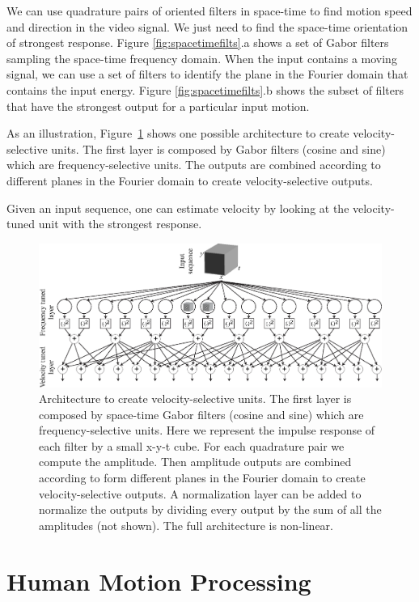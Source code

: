 We can use quadrature pairs of oriented filters in space-time to find motion
speed and direction in the video signal.  We just need to find the
space-time orientation of strongest response. Figure \ref{fig:spacetimefilts}.a shows a set of Gabor filters sampling the space-time frequency domain. When the input contains a moving signal, we can use a set of filters to identify the plane in the Fourier domain that contains the input energy. Figure \ref{fig:spacetimefilts}.b shows the subset of filters that have the strongest output for a particular input motion. 


As an illustration, Figure~\ref{fig:MT_velocity_tuned} shows one possible architecture to create velocity-selective units. The first layer is composed by Gabor filters (cosine and sine) which are frequency-selective units. The outputs are combined according to different planes in the Fourier domain to create velocity-selective outputs. 

Given an input sequence, one can estimate velocity by looking at the velocity-tuned unit with the strongest response. 

\begin{figure}
\centerline{
\includegraphics[width=1\linewidth]{figures/temporal_filters/MT_velocity_tuned.eps}
}
\caption{Architecture to create velocity-selective units. The first layer is composed by space-time Gabor filters (cosine and sine) which are frequency-selective units. Here we represent the impulse response of each filter by a small x-y-t cube. For each quadrature pair we compute the amplitude. Then amplitude outputs are combined according to form different planes in the Fourier domain to create velocity-selective outputs. A normalization layer can be added to normalize the outputs by dividing every output by the sum of all the amplitudes (not shown). The full architecture is non-linear.}
\label{fig:MT_velocity_tuned}
\end{figure}

\section{Human Motion Processing}

